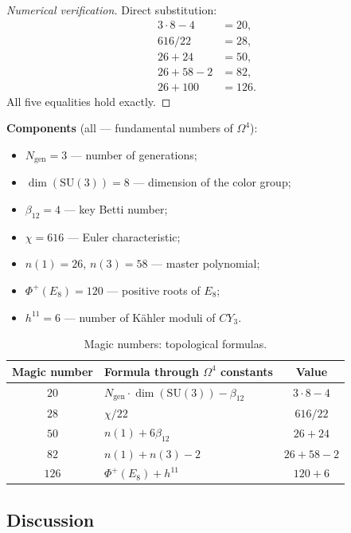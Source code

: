 \documentclass[11pt,a4paper]{article}
\newcommand{\SU}{\ensuremath{\mathrm{SU}}}
\newcommand{\CY}{\ensuremath{CY_3}}
\newcommand{\Om}{\ensuremath{\Omega^4}}
\newcommand{\Ngen}{\ensuremath{N_{\text{gen}}}}
\theoremstyle{definition}
\begin{document}
\begin{proof}[Numerical verification]
Direct substitution:
\begin{align}
    3 \cdot 8 - 4 &= 20, \\
    616 / 22 &= 28, \\
    26 + 24 &= 50, \\
    26 + 58 - 2 &= 82, \\
    26 + 100 &= 126.
\end{align}
All five equalities hold exactly.
\end{proof}

\medskip\noindent
\textbf{Components} (all --- fundamental numbers of $\Om$):
\begin{itemize}
    \item $\Ngen = 3$ --- number of generations;
    \item $\dim(\SU(3)) = 8$ --- dimension of the color group;
    \item $\beta_{12} = 4$ --- key Betti number;
    \item $\chi = 616$ --- Euler characteristic;
    \item $n(1) = 26$, $n(3) = 58$ --- master polynomial;
    \item $\Phi^+(E_8) = 120$ --- positive roots of $E_8$;
    \item $h^{11} = 6$ --- number of K\"ahler moduli of $\CY$.
\end{itemize}

\begin{table}[ht]
\centering
\caption{Magic numbers: topological formulas.}
\label{tab:magic-numbers}
\begin{tabular}{clc}
\toprule
Magic number & Formula through $\Om$ constants & Value \\
\midrule
$20$  & $\Ngen \cdot \dim(\SU(3)) - \beta_{12}$ & $3 \cdot 8 - 4$ \\
$28$  & $\chi / 22$                             & $616/22$ \\
$50$  & $n(1) + 6 \beta_{12}$                   & $26 + 24$ \\
$82$  & $n(1) + n(3) - 2$                       & $26 + 58 - 2$ \\
$126$ & $\Phi^+(E_8) + h^{11}$                  & $120 + 6$ \\
\bottomrule
\end{tabular}
\end{table}

\subsection{Discussion}
\label{subsec:nuclear-discussion}
\end{document}
